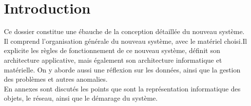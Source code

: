 \section{Introduction}
Ce dossier constitue une ébauche de la conception
détaillée du nouveau système. Il comprend l'organisation
générale du nouveau système, avec le matériel choisi.Il
explicite les règles de fonctionnement de ce nouveau système,
définit son architecture applicative, mais également son
architecture informatique et matérielle. On y aborde aussi
une réflexion sur les données, ainsi que la gestion des problèmes
et autres anomalies. \\
En annexes sont discutés les points que sont la représentation
informatique des objets, le réseau, ainsi que le démarage du système.
